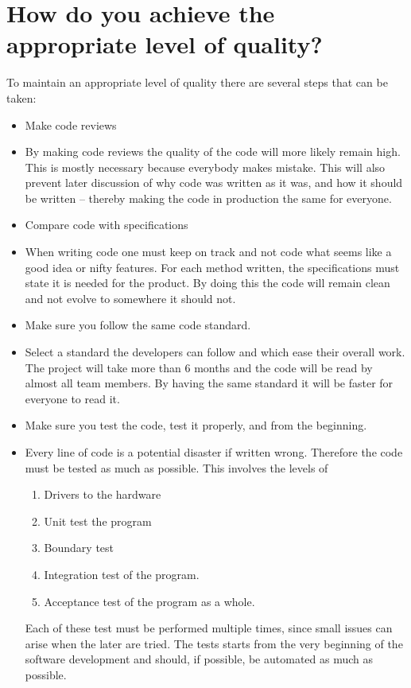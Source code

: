 \documentclass[Main]{subfiles}
\begin{document}
\vspace{-5mm}
\section{How do you achieve the appropriate level of quality?}

To maintain an appropriate level of quality there are several steps that can be taken:

\vspace{-5mm}
\begin{itemize}
	\item Make code reviews
	\item[] By making code reviews the quality of the code will more likely remain high.
	This is mostly necessary because everybody makes mistake.
	This will also prevent later discussion of why code was written as it was, and how it should be written -- thereby making the code in production the same for everyone.

	\item Compare code with specifications
	\item[] When writing code one must keep on track and not code what seems like a good idea or nifty features.
	For each method written, the specifications must state it is needed for the product.
	By doing this the code will remain clean and not evolve to somewhere it should not.


	\item Make sure you follow the same code standard.
	\item[] Select a standard the developers can follow and which ease their overall work. 
	The project will take more than 6 months and the code will be read by almost all team members.
	By having the same standard it will be faster for everyone to read it.

	\item Make sure you test the code, test it properly, and from the beginning.
	\item[] Every line of code is a potential disaster if written wrong.
	Therefore the code must be tested as much as possible. 
	This involves the levels of
	\begin{enumerate}
		\item Drivers to the hardware
		\item Unit test the program
		\item Boundary test
		\item Integration test of the program.
		\item Acceptance test of the program as a whole.
	\end{enumerate}
	Each of these test must be performed multiple times, since small issues can arise when the later are tried.
	The tests starts from the very beginning of the software development and should, if possible, be automated as much as possible.


\end{itemize}
\end{document}
